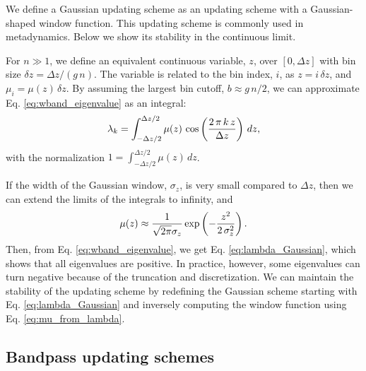 \documentclass[preprint, superscriptaddress, floatfix]{revtex4-1}
\begin{document}
We define a Gaussian updating scheme
as an updating scheme with a
Gaussian-shaped window function.
%
This updating scheme is commonly
used in metadynamics.
%
Below we show its stability
in the continuous limit.



For $n \gg 1$,
we define an equivalent continuous variable, $z$,
over $[0, \Delta z]$
with bin size
$\delta z = \Delta z/(g \, n)$.
The variable is related to the bin index, $i$, as
$z = i \, \delta z$,
and
$\mu_i = \mu(z) \, \delta z$.
%
By assuming the largest bin cutoff, $b \approx g \, n/2$,
we can approximate Eq. \eqref{eq:wband_eigenvalue}
as an integral:
%
\begin{equation}
  \lambda_k
  =
  \int_{-\Delta z/2}^{\Delta z/2}
    \mu(z) \, \cos\left( \frac{ 2 \, \pi \, k \, z } { \Delta z} \right)
    \, d z,
  \notag
\end{equation}
%
with the normalization
$1 = \int_{-\Delta z/2}^{\Delta z/2} \mu(z) \, dz$.

If the width of the Gaussian window, $\sigma_z$,
is very small compared to $\Delta z$,
then we can extend the limits of the integrals
to infinity, and
%
\begin{equation}
  \mu(z)
  \approx
  \frac{            1            }
       { \sqrt{ 2 \pi } \sigma_z }
  \exp\left(
        -\frac{   z^2   }
              { 2 \, \sigma_z^2 }
      \right)
  .
\notag
\end{equation}
%
Then, from Eq. \eqref{eq:wband_eigenvalue},
we get Eq. \eqref{eq:lambda_Gaussian},
which shows that all eigenvalues are positive.
%
In practice, however, some eigenvalues can turn negative
because of the truncation and discretization.
%
We can maintain the stability of the updating scheme
by redefining the Gaussian scheme
starting with Eq. \eqref{eq:lambda_Gaussian}
and inversely computing the window function
using Eq. \eqref{eq:mu_from_lambda}.
%



\subsection{\label{sec:homo_bandpass}
Bandpass updating schemes}
\end{document}
